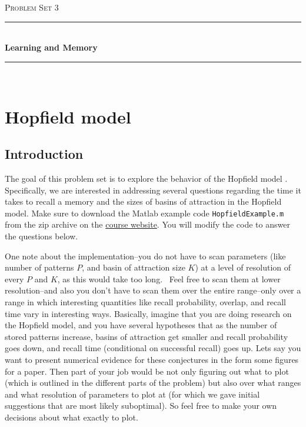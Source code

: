 \documentclass[letterpaper,11pt]{article}
\newcommand{\HRule}{\rule{\linewidth}{0.5mm}}
\begin{document}
\begin{center}
\thispagestyle{empty}

\textsc{\Large Problem Set 3}\\[0.5cm]

\HRule \\[0.6cm]
{ \huge \bfseries Learning and Memory}\\[0.2cm]

\HRule \\[2.5cm]

\end{center}
\tableofcontents

\section{Hopfield model}
\subsection*{Introduction}
The goal of this problem set is to explore the behavior of the Hopfield model \cite{hopfield1982,hopfield}.
Specifically, we are interested in addressing several questions regarding the time it takes to recall a memory and the sizes of basins of attraction in the Hopfield model. 
Make sure to download the Matlab example code \texttt{HopfieldExample.m} from the zip archive on the \href{http://baccuslab.github.io/nepr208}{course website}.
You will modify the code to answer the questions below.

One note about the implementation--you do not have to scan parameters (like number of patterns $P$, and basin of attraction size $K$) at a level of resolution of every $P$ and $K$, as this would take too long.  Feel free to scan them at lower resolution--and also you don't have to scan them over the entire range--only over a range in which interesting quantities like recall probability, overlap, and recall time vary in interesting ways.
Basically, imagine that you are doing research on the Hopfield model, and you have several hypotheses that as the number of stored patterns increase, basins of attraction get smaller and recall probability goes down, and recall time (conditional on successful recall) goes up.
Lets say you want to present numerical evidence for these conjectures in the form some figures for a paper.
Then part of your job would be not only figuring out what to plot (which is outlined in the different parts of the problem) but also over what ranges and what resolution of parameters to plot at (for which we gave initial suggestions that are most likely suboptimal).
So feel free to make your own decisions about what exactly to plot.
\end{document}

